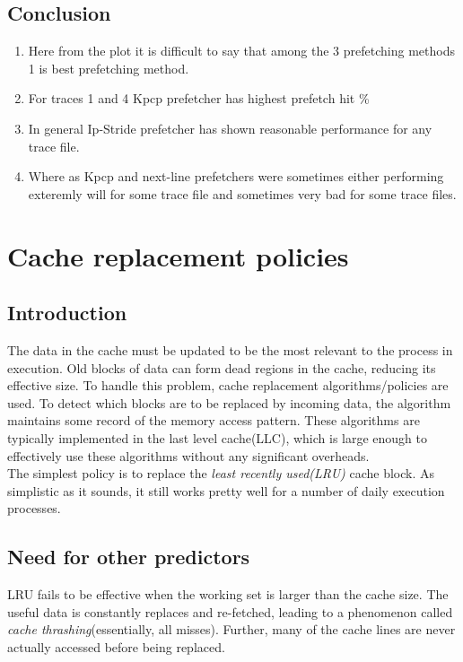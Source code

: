 \documentclass[a4paper]{article}
\begin{document}
     \subsection{Conclusion}
      \begin{enumerate}
            \item Here from the plot it is difficult to say that among the 3 prefetching methods 1 is best prefetching method.
            \item For traces 1 and 4 Kpcp prefetcher has highest prefetch hit \% 
            \item In general Ip-Stride prefetcher has shown reasonable performance for any trace file.
            \item Where as Kpcp  and next-line prefetchers were sometimes either performing exteremly will for some trace file and sometimes very bad for some trace files.
        \end{enumerate}
     
\pagebreak
\section{Cache replacement policies}
    \subsection{Introduction}
        The data in the cache must be updated to be the most relevant to the process in execution. Old blocks of data can form dead regions in the cache, reducing its effective size. To handle this problem, cache replacement algorithms/policies are used. To detect which blocks are to be replaced by incoming data, the algorithm maintains some record of the memory access pattern. These algorithms are typically implemented in the last level cache(LLC), which is large enough to effectively use these algorithms without any significant overheads.\\
    
        The simplest policy is to replace the \textit{least recently used(LRU)} cache block. As simplistic as it sounds, it still works pretty well for a number of daily execution processes.
        
    \subsection{Need for other predictors}
        LRU fails to be effective when the working set is larger than the cache size. The useful data is constantly replaces and re-fetched, leading to a phenomenon called \textit{cache thrashing}(essentially, all misses). Further, many of the cache lines are never actually accessed before being replaced.\\
        
\end{document}
